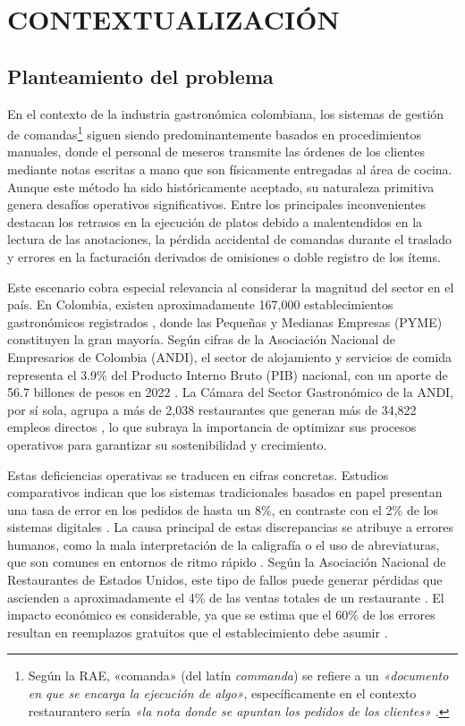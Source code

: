 \chapter{CONTEXTUALIZACIÓN}

\section{Planteamiento del problema}

En el contexto de la industria gastronómica colombiana, los sistemas de gestión de comandas\footnote{Según la RAE, «comanda» (del latín \textit{commanda}) se refiere a un \textit{«documento en que se encarga la ejecución de algo»}, específicamente en el contexto restaurantero sería \textit{«la nota donde se apuntan los pedidos de los clientes»} \cite{rae2024}.} siguen siendo predominantemente basados en procedimientos manuales, donde el personal de meseros transmite las órdenes de los clientes mediante notas escritas a mano que son físicamente entregadas al área de cocina. Aunque este método ha sido históricamente aceptado, su naturaleza primitiva genera desafíos operativos significativos. Entre los principales inconvenientes destacan los retrasos en la ejecución de platos debido a malentendidos en la lectura de las anotaciones, la pérdida accidental de comandas durante el traslado y errores en la facturación derivados de omisiones o doble registro de los ítems.

Este escenario cobra especial relevancia al considerar la magnitud del sector en el país. En Colombia, existen aproximadamente 167,000 establecimientos gastronómicos registrados \cite{acodres_estadisticas_2021}, donde las Pequeñas y Medianas Empresas (PYME) constituyen la gran mayoría. Según cifras de la Asociación Nacional de Empresarios de Colombia (ANDI), el sector de alojamiento y servicios de comida representa el 3.9\% del Producto Interno Bruto (PIB) nacional, con un aporte de 56.7 billones de pesos en 2022 \cite{andi_pib_2024}. La Cámara del Sector Gastronómico de la ANDI, por sí sola, agrupa a más de 2,038 restaurantes que generan más de 34,822 empleos directos \cite{andi_gastronomia_2023}, lo que subraya la importancia de optimizar sus procesos operativos para garantizar su sostenibilidad y crecimiento.

Estas deficiencias operativas se traducen en cifras concretas. Estudios comparativos indican que los sistemas tradicionales basados en papel presentan una tasa de error en los pedidos de hasta un 8\%, en contraste con el 2\% de los sistemas digitales \cite{Daniel2024}. La causa principal de estas discrepancias se atribuye a errores humanos, como la mala interpretación de la caligrafía o el uso de abreviaturas, que son comunes en entornos de ritmo rápido \cite{LSRetail2025}. Según la Asociación Nacional de Restaurantes de Estados Unidos, este tipo de fallos puede generar pérdidas que ascienden a aproximadamente el 4\% de las ventas totales de un restaurante \cite{Khan2023}. El impacto económico es considerable, ya que se estima que el 60\% de los errores resultan en reemplazos gratuitos que el establecimiento debe asumir \cite{Checkmate2025}.

